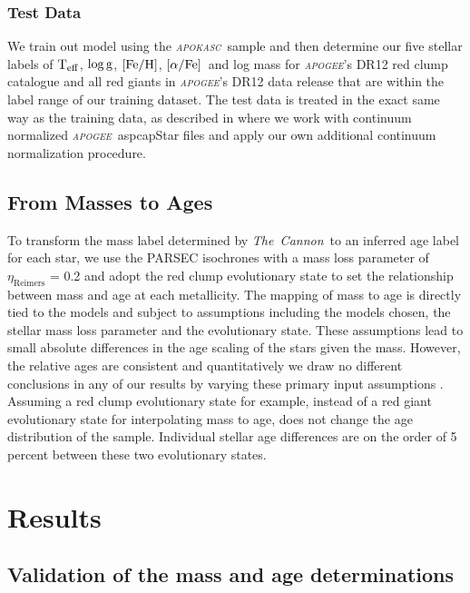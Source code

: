 \documentclass[12pt, preprint]{aastex}
\newcommand{\project}[1]{\textsl{#1}}
\newcommand{\tc}{\project{The~Cannon}}
\newcommand{\apogee}{\project{\textsc{apogee}}}
\newcommand{\apokasc}{\project{\textsc{apokasc}}}
\newcommand{\teff}{\mbox{$\rm T_{eff}$}}
\newcommand{\feh}{\mbox{$\rm [Fe/H]$}}
\newcommand{\alphafe}{\mbox{$\rm [\alpha/Fe]$}}
\newcommand{\logg}{\mbox{$\rm \log g$}}
\begin{document}
\subsubsection{Test Data} 

We train out model using the \apokasc\ sample and then determine our five stellar labels of \teff, \logg, \feh, \alphafe\ and log mass for \apogee's DR12 red clump catalogue \citet{Bovy2014} and all red giants in \apogee's DR12 data release that are within the label range of our training dataset.  The test data is treated in the exact same way as the training data, as described in \citet{Ness2015} where we work with continuum normalized \apogee\ aspcapStar files and apply our own additional continuum normalization procedure. 

\subsection{From Masses to Ages}

To transform the mass label determined by \tc\ to an inferred age label for each star, we use the PARSEC isochrones \citep{Bressan2012} with a mass loss parameter of $\eta_{\mbox{Reimers}}$ = 0.2 and adopt the red clump evolutionary state to set the relationship between mass and age at each metallicity.  The mapping of mass to age is directly tied to the models and subject to assumptions including the models chosen, the stellar mass loss parameter and the evolutionary state. These assumptions lead to small absolute differences in the age scaling of the stars given the mass. However,  the relative ages are consistent and quantitatively we draw no different conclusions in any of our results by varying these primary input assumptions \citep[see also][]{Bovy2014}. Assuming a red clump evolutionary state for example, instead of a red giant evolutionary state for interpolating mass to age, does not change the age distribution of the sample. Individual stellar age differences are on the order of 5\,percent between these two evolutionary states. 

\section{Results}

\subsection{Validation of the mass and age determinations}
\end{document}
